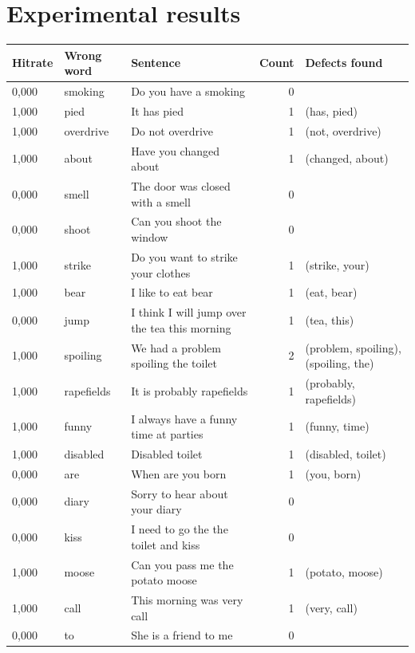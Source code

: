 \documentclass[a4paper,12pt]{article}
\begin{document}
\section{Experimental results}
\label{sec:experimentalresults}

\begin{landscape}
\centering
\begin{longtable}{l l l r l}
Hitrate & Wrong word & Sentence & Count & Defects found \\
\hline
0,000 & smoking & Do you have a smoking & 0 &  \\
1,000 & pied & It has pied & 1 & (has, pied) \\
1,000 & overdrive & Do not overdrive & 1 & (not, overdrive) \\
1,000 & about & Have you changed about & 1 & (changed, about) \\
0,000 & smell & The door was closed with a smell & 0 &  \\
0,000 & shoot & Can you shoot the window & 0 &  \\
1,000 & strike & Do you want to strike your clothes & 1 & (strike, your) \\
1,000 & bear & I like to eat bear & 1 & (eat, bear) \\
0,000 & jump & I think I will jump over the tea this morning & 1 & (tea, this) \\
1,000 & spoiling & We had a problem spoiling the toilet & 2 & (problem, spoiling), (spoiling, the) \\
1,000 & rapefields & It is probably rapefields & 1 & (probably, rapefields) \\
1,000 & funny & I always have a funny time at parties & 1 & (funny, time) \\
1,000 & disabled & Disabled toilet & 1 & (disabled, toilet) \\
0,000 & are & When are you born & 1 & (you, born) \\
0,000 & diary & Sorry to hear about your diary & 0 &  \\
0,000 & kiss & I need to go the the toilet and kiss & 0 &  \\
1,000 & moose & Can you pass me the potato moose & 1 & (potato, moose) \\
1,000 & call & This morning was very call & 1 & (very, call) \\
0,000 & to & She is a friend to me & 0 &  \\

\end{longtable}
\end{landscape}
\end{document}
